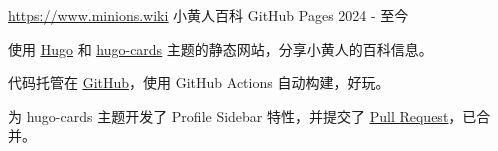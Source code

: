 \begin{cventries}
  \cventry
    {\href{https://www.minions.wiki}{\uline{https://www.minions.wiki}}} %
    {小黄人百科} %
    {GitHub Pages} %
    {2024 - 至今} %
    {
      \begin{cvitems} %
        \item {使用 \href{https://gohugo.io/}{\uline{Hugo}} 和 \href{https://github.com/bul-ikana/hugo-cards}{\uline{hugo-cards}} 主题的静态网站，分享小黄人的百科信息。}
        \item {代码托管在 \href{https://github.com/kugarocks/minions.wiki}{\uline{GitHub}}，使用 GitHub Actions 自动构建，好玩。}
        \item {为 hugo-cards 主题开发了 Profile Sidebar 特性，并提交了 \href{https://github.com/bul-ikana/hugo-cards/pull/28}{\uline{Pull Request}}，已合并。}
      \end{cvitems}
    }

\end{cventries}

